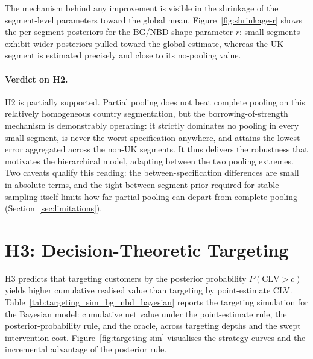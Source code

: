 

The mechanism behind any improvement is visible in the shrinkage of the segment-level parameters toward the global mean. Figure~\ref{fig:shrinkage-r} shows the per-segment posteriors for the BG/NBD shape parameter $r$: small segments exhibit wider posteriors pulled toward the global estimate, whereas the UK segment is estimated precisely and close to its no-pooling value.


\paragraph{Verdict on H2.}
H2 is partially supported. Partial pooling does not beat complete pooling on this relatively homogeneous country segmentation, but the borrowing-of-strength mechanism is demonstrably operating: it strictly dominates no pooling in every small segment, is never the worst specification anywhere, and attains the lowest error aggregated across the non-UK segments. It thus delivers the robustness that motivates the hierarchical model, adapting between the two pooling extremes. Two caveats qualify this reading: the between-specification differences are small in absolute terms, and the tight between-segment prior required for stable sampling itself limits how far partial pooling can depart from complete pooling (Section~\ref{sec:limitations}).

\section{H3: Decision-Theoretic Targeting}
\label{sec:results-h3}

H3 predicts that targeting customers by the posterior probability $P(\text{CLV} > c)$ yields higher cumulative realised value than targeting by point-estimate CLV. Table~\ref{tab:targeting_sim_bg_nbd_bayesian} reports the targeting simulation for the Bayesian model: cumulative net value under the point-estimate rule, the posterior-probability rule, and the oracle, across targeting depths and the swept intervention cost. Figure~\ref{fig:targeting-sim} visualises the strategy curves and the incremental advantage of the posterior rule.

